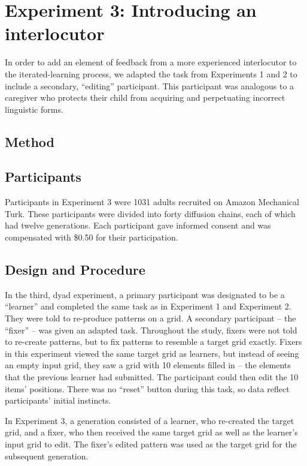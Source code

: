 \documentclass[10pt, letterpaper]{article}
\begin{document}
\section{Experiment 3: Introducing an
interlocutor}\label{experiment-3-introducing-an-interlocutor}

In order to add an element of feedback from a more experienced
interlocutor to the iterated-learning process, we adapted the task from
Experiments 1 and 2 to include a secondary, ``editing'' participant.
This participant was analogous to a caregiver who protects their child
from acquiring and perpetuating incorrect linguistic forms.

\subsection{Method}\label{method-2}

\subsection{Participants}\label{participants-2}

Participants in Experiment 3 were 1031 adults recruited on Amazon
Mechanical Turk. These participants were divided into forty diffusion
chains, each of which had twelve generations. Each participant gave
informed consent and was compensated with \$0.50 for their
participation.

\subsection{Design and Procedure}\label{design-and-procedure-2}

In the third, dyad experiment, a primary participant was designated to
be a ``learner'' and completed the same task as in Experiment 1 and
Experiment 2. They were told to re-produce patterns on a grid. A
secondary participant -- the ``fixer'' -- was given an adapted task.
Throughout the study, fixers were not told to re-create patterns, but to
fix patterns to resemble a target grid exactly. Fixers in this
experiment viewed the same target grid as learners, but instead of
seeing an empty input grid, they saw a grid with 10 elements filled in
-- the elements that the previous learner had submitted. The participant
could then edit the 10 items' positions. There was no ``reset'' button
during this task, so data reflect participants' initial instincts.

In Experiment 3, a generation consisted of a learner, who re-created the
target grid, and a fixer, who then received the same target grid as well
as the learner's input grid to edit. The fixer's edited pattern was used
as the target grid for the subsequent generation.
\end{document}
